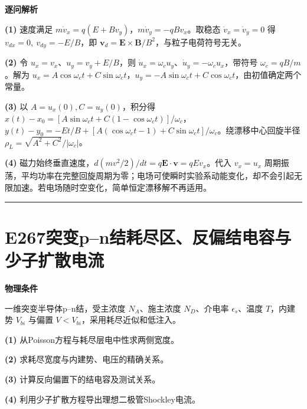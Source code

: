 \documentclass[UTF8,a4paper,11pt,oneside,openany]{ctexbook}
\begin{document}
\par\medskip\noindent\textbf{逐问解析}
\par\noindent\textbf{(1)} 速度满足 \(m\dot v_x=q(E+Bv_y)\)，\(m\dot v_y=-qBv_x\)。取稳态 \(\dot v_x=\dot v_y=0\) 得 \(v_{dx}=0,\ v_{dy}=-E/B\)，即 \(\boldsymbol v_d=\boldsymbol E\times\boldsymbol B/B^2\)，与粒子电荷符号无关。
\par\noindent\textbf{(2)} 令 \(u_x=v_x\)、\(u_y=v_y+E/B\)，则 \(\dot u_x=\omega_cu_y\)、\(\dot u_y=-\omega_cu_x\)，带符号 \(\omega_c=qB/m\)。解为 \(u_x=A\cos\omega_ct+C\sin\omega_ct\)，\(u_y=-A\sin\omega_ct+C\cos\omega_ct\)，由初值确定两个常量。
\par\noindent\textbf{(3)} 以 \(A=u_x(0),C=u_y(0)\)，积分得 \(x(t)-x_0=[A\sin\omega_ct+C(1-\cos\omega_ct)]/\omega_c\)，\(y(t)-y_0=-Et/B+[A(\cos\omega_ct-1)+C\sin\omega_ct]/\omega_c\)。绕漂移中心回旋半径 \(\rho_L=\sqrt{A^2+C^2}/|\omega_c|\)。
\par\noindent\textbf{(4)} 磁力始终垂直速度，\(d(mv^2/2)/dt=q\boldsymbol E\cdot\boldsymbol v=qEv_x\)。代入 \(v_x=u_x\) 周期振荡，平均功率在完整回旋周期为零；电场可使瞬时实验系动能变化，却不会引起无限加速。若电场随时空变化，简单恒定漂移解不再适用。

\par\bigskip\hrule\bigskip
\section*{E267\quad 突变p–n结耗尽区、反偏结电容与少子扩散电流}
\textbf{物理条件}\par 一维突变半导体p–n结，受主浓度 \(N_A\)、施主浓度 \(N_D\)、介电率 \(\epsilon_s\)、温度 \(T\)，内建势 \(V_{bi}\) 与偏置 \(V<V_{bi}\)，采用耗尽近似和低注入。
\par\noindent\textbf{(1)} 从Poisson方程与耗尽层电中性求两侧宽度。
\par\noindent\textbf{(2)} 求耗尽宽度与内建势、电压的精确关系。
\par\noindent\textbf{(3)} 计算反向偏置下的结电容及测试关系。
\par\noindent\textbf{(4)} 利用少子扩散方程导出理想二极管Shockley电流。
\end{document}
